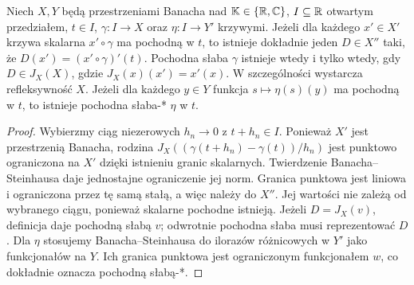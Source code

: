 \begin{twierdzenie}
\label{thm:scalar-curve-derivative14}
Niech $X,Y$ będą przestrzeniami Banacha nad $\mathbb K\in\{\mathbb R,\mathbb C\}$,
$I\subseteq\mathbb R$ otwartym przedziałem, $t\in I$,
$\gamma:I\to X$ oraz $\eta:I\to Y'$ krzywymi.
Jeżeli dla każdego $x'\in X'$ krzywa skalarna $x'\circ\gamma$ ma
pochodną w $t$, to istnieje dokładnie jeden $D\in X''$
taki, że $D(x')=(x'\circ\gamma)'(t)$. Pochodna słaba
$\gamma$ istnieje wtedy i tylko wtedy, gdy $D\in J_X(X)$,
gdzie $J_X(x)(x')=x'(x)$. W szczególności wystarcza
refleksywność $X$. Jeżeli dla każdego $y\in Y$ funkcja
$s\mapsto\eta(s)(y)$ ma pochodną w $t$, to istnieje
pochodna słaba-* $\eta$ w $t$.
\end{twierdzenie}
\begin{proof}
Wybierzmy ciąg niezerowych $h_n\to0$ z $t+h_n\in I$.
Ponieważ $X'$ jest przestrzenią Banacha, rodzina $J_X((\gamma(t+h_n)-\gamma(t))/h_n)$ jest
punktowo ograniczona na $X'$ dzięki istnieniu granic
skalarnych. Twierdzenie Banacha--Steinhausa daje
jednostajne ograniczenie jej norm. Granica punktowa
jest liniowa i ograniczona przez tę samą stałą,
a więc należy do $X''$. Jej wartości nie zależą od
wybranego ciągu, ponieważ skalarne pochodne istnieją.
Jeżeli $D=J_X(v)$, definicja daje pochodną słabą $v$;
odwrotnie pochodna słaba musi reprezentować $D$.
Dla $\eta$ stosujemy Banacha--Steinhausa do ilorazów
różnicowych w $Y'$ jako funkcjonałów na $Y$.
Ich granica punktowa jest ograniczonym funkcjonałem
$w$, co dokładnie oznacza pochodną słabą-*.
\end{proof}

